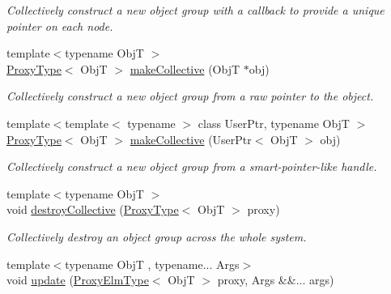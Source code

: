 \begin{DoxyCompactItemize}
\begin{DoxyCompactList}\small\item\em Collectively construct a new object group with a callback to provide a unique pointer on each node. \end{DoxyCompactList}\item 
{\footnotesize template$<$typename ObjT $>$ }\\\hyperlink{structvt_1_1objgroup_1_1_obj_group_manager_aea65eef52f240a52210132eef5ce591f}{Proxy\+Type}$<$ ObjT $>$ \hyperlink{structvt_1_1objgroup_1_1_obj_group_manager_a08fdc6029708edf1e3f7a4a66c998b99}{make\+Collective} (ObjT $\ast$obj)
\begin{DoxyCompactList}\small\item\em Collectively construct a new object group from a raw pointer to the object. \end{DoxyCompactList}\item 
{\footnotesize template$<$template$<$ typename $>$ class User\+Ptr, typename ObjT $>$ }\\\hyperlink{structvt_1_1objgroup_1_1_obj_group_manager_aea65eef52f240a52210132eef5ce591f}{Proxy\+Type}$<$ ObjT $>$ \hyperlink{structvt_1_1objgroup_1_1_obj_group_manager_affb52495aa20a14b485ad3ba48234718}{make\+Collective} (User\+Ptr$<$ ObjT $>$ obj)
\begin{DoxyCompactList}\small\item\em Collectively construct a new object group from a smart-\/pointer-\/like handle. \end{DoxyCompactList}\item 
{\footnotesize template$<$typename ObjT $>$ }\\void \hyperlink{structvt_1_1objgroup_1_1_obj_group_manager_ad02bff10088a4f8e453cf24bd832308c}{destroy\+Collective} (\hyperlink{structvt_1_1objgroup_1_1_obj_group_manager_aea65eef52f240a52210132eef5ce591f}{Proxy\+Type}$<$ ObjT $>$ proxy)
\begin{DoxyCompactList}\small\item\em Collectively destroy an object group across the whole system. \end{DoxyCompactList}\item 
{\footnotesize template$<$typename ObjT , typename... Args$>$ }\\void \hyperlink{structvt_1_1objgroup_1_1_obj_group_manager_abd0f61b0578a268a27420f2c38e3b12d}{update} (\hyperlink{structvt_1_1objgroup_1_1_obj_group_manager_adba6c8ecb0f4c30e719f1abb995cfc9b}{Proxy\+Elm\+Type}$<$ ObjT $>$ proxy, Args \&\&... args)

\end{DoxyCompactItemize}
